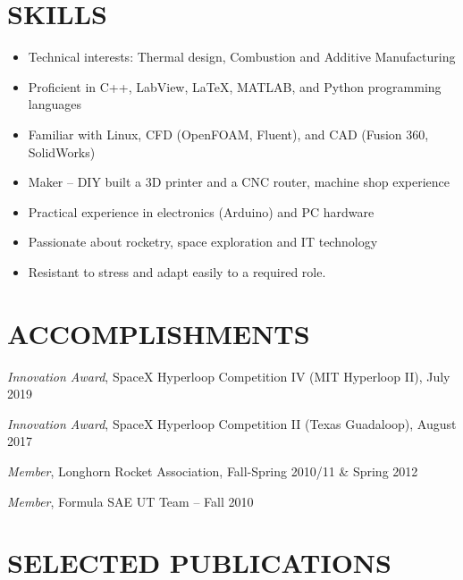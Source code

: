 \documentclass[11pt]{res}
\begin{document}
\begin{resume}
        
\section{SKILLS}   

	\begin{itemize}
  	\setlength{\leftmargin}{-10pt} 
  	\setlength\itemsep{4pt}
    \setlength{\parskip}{0pt}
	\item Technical interests: Thermal design, Combustion and Additive Manufacturing
	\item Proficient in C++, LabView, LaTeX, MATLAB, and Python programming languages
	\item Familiar with Linux, CFD (OpenFOAM, Fluent), and CAD (Fusion 360, SolidWorks)
	\item Maker  {}-- DIY built a 3D printer and a CNC router, machine shop experience
	\item Practical experience in electronics (Arduino) and PC hardware
	\item Passionate about rocketry, space exploration and IT technology
	\item Resistant to stress and adapt easily to a required role.
	\end{itemize}


\section{ACCOMPLISHMENTS}
\vspace{5pt}

	\textit{Innovation Award}, SpaceX Hyperloop Competition IV (MIT Hyperloop II), July 2019
	\vspace{-5pt}
	
	\textit{Innovation Award}, SpaceX Hyperloop Competition II (Texas Guadaloop), August 2017

	\vspace{-5pt}
	\textit{Member}, Longhorn Rocket Association, Fall-Spring 2010/11 \& Spring 2012
	
	\vspace{-5pt}
	\textit{Member}, Formula SAE UT Team {}--  Fall 2010     
	
\section{SELECTED PUBLICATIONS}
 \vspace{5pt}
 

\end{resume}
\end{document}
